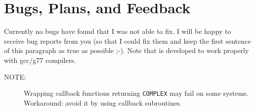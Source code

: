 
\section{Bugs, Plans, and Feedback}
\label{sec:bugs}

Currently no bugs have found that I was not able to fix.  I will be
happy to receive bug reports from you (so that I could fix them and
keep the first sentence of this paragraph as true as possible ;-).
Note that \fpy is developed to work properly with gcc/g77
compilers. 
\begin{description}
\item[NOTE:] Wrapping callback functions returning \texttt{COMPLEX}
  may fail on some systems. Workaround: avoid it by using callback
  subroutines.
\end{description}

